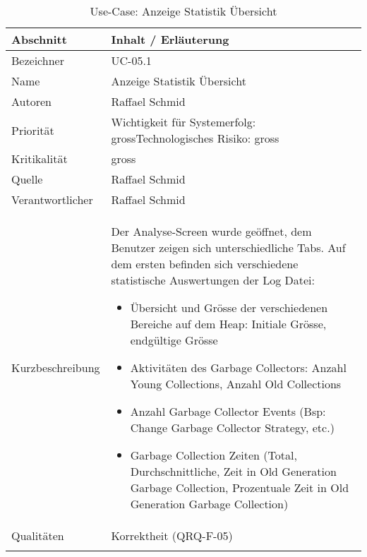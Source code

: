 \begin{longtable}{|p{4cm}|p{10.5cm}|}
\hline
   \textbf{Abschnitt} & \textbf{Inhalt / Erläuterung} \\\hline
   Bezeichner & UC-05.1\\\hline
   Name & Anzeige Statistik Übersicht\\\hline
   Autoren & Raffael Schmid\\\hline
   Priorität & Wichtigkeit für Systemerfolg: gross\newline Technologisches Risiko: gross\\\hline
   Kritikalität & gross\\\hline
   Quelle & Raffael Schmid\\\hline
   Verantwortlicher & Raffael Schmid\\\hline
   Kurzbeschreibung & Der Analyse-Screen wurde geöffnet, dem Benutzer zeigen sich unterschiedliche Tabs. Auf dem ersten befinden sich verschiedene statistische Auswertungen der Log Datei:
   \begin{itemize}
	\item Übersicht und Grösse der verschiedenen Bereiche auf dem Heap: Initiale Grösse, endgültige Grösse
	\item Aktivitäten des Garbage Collectors: Anzahl Young Collections, Anzahl Old Collections
	\item Anzahl Garbage Collector Events (Bsp: Change Garbage Collector Strategy, etc.)
	\item Garbage Collection Zeiten (Total, Durchschnittliche, Zeit in Old Generation Garbage Collection, Prozentuale Zeit in Old Generation Garbage Collection)
   \end{itemize}
 \\\hline
   Qualitäten & Korrektheit (QRQ-F-05)\\\hline
\caption{Use-Case: Anzeige Statistik Übersicht}
\end{longtable}

